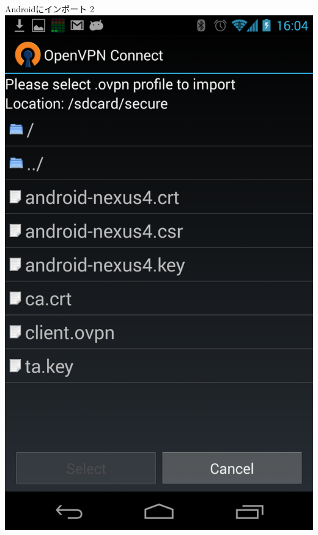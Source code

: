 \begin{frame}{Androidにインポート 2}
\includegraphics[height=0.9\vsize,bb=0 0 768 1280]{image201308/Screenshot_2013-08-17-16-04-43.png}

\end{frame}
